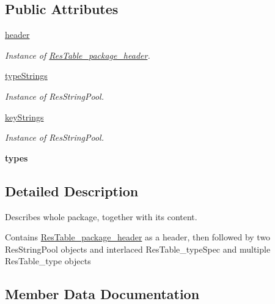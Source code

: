 \subsection*{Public Attributes}
\begin{DoxyCompactItemize}
\item 
\mbox{\hyperlink{classpackage_1_1ResTable__package_a09d6e4d17baa35da87d3ac44ef9d6bef}{header}}
\begin{DoxyCompactList}\small\item\em Instance of \mbox{\hyperlink{classpackage_1_1ResTable__package__header}{Res\+Table\+\_\+package\+\_\+header}}. \end{DoxyCompactList}\item 
\mbox{\hyperlink{classpackage_1_1ResTable__package_abb2bd37ba83fe03e836ecd869a1cafa6}{type\+Strings}}
\begin{DoxyCompactList}\small\item\em Instance of Res\+String\+Pool. \end{DoxyCompactList}\item 
\mbox{\hyperlink{classpackage_1_1ResTable__package_a6e813d4278285e770abe6e6659ae78e9}{key\+Strings}}
\begin{DoxyCompactList}\small\item\em Instance of Res\+String\+Pool. \end{DoxyCompactList}\item 
\mbox{\label{classpackage_1_1ResTable__package_a3698a4c784cc989876b266f8275e7007}} 
{\bfseries types}
\end{DoxyCompactItemize}


\subsection{Detailed Description}
Describes whole package, together with its content. 

Contains \mbox{\hyperlink{classpackage_1_1ResTable__package__header}{Res\+Table\+\_\+package\+\_\+header}} as a header, then followed by two Res\+String\+Pool objects and interlaced Res\+Table\+\_\+type\+Spec and multiple Res\+Table\+\_\+type objects 

\subsection{Member Data Documentation}
\mbox{\label{classpackage_1_1ResTable__package_a09d6e4d17baa35da87d3ac44ef9d6bef}} 
